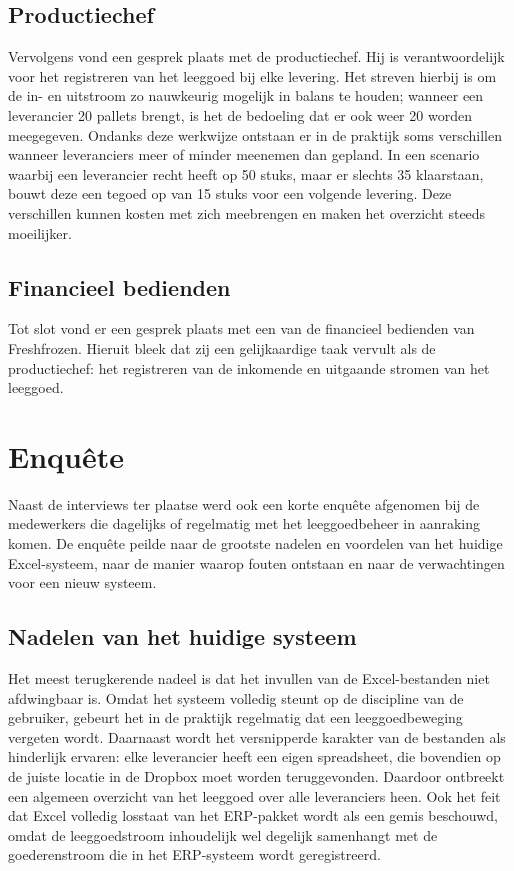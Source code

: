 \subsection{Productiechef}

Vervolgens vond een gesprek plaats met de productiechef. Hij is verantwoordelijk voor het registreren van het leeggoed bij elke levering. Het streven hierbij is om de in- en uitstroom zo nauwkeurig mogelijk in balans te houden; wanneer een leverancier 20 pallets brengt, is het de bedoeling dat er ook weer 20 worden meegegeven.
Ondanks deze werkwijze ontstaan er in de praktijk soms verschillen wanneer leveranciers meer of minder meenemen dan gepland. In een scenario waarbij een leverancier recht heeft op 50 stuks, maar er slechts 35 klaarstaan, bouwt deze een tegoed op van 15 stuks voor een volgende levering. Deze verschillen kunnen kosten met zich meebrengen en maken het overzicht steeds moeilijker.

\subsection{Financieel bedienden}

Tot slot vond er een gesprek plaats met een van de financieel bedienden van Freshfrozen. Hieruit bleek dat zij een gelijkaardige taak vervult als de productiechef: het registreren van de inkomende en uitgaande stromen van het leeggoed.

\section{Enquête}
\label{sec:enquete}

Naast de interviews ter plaatse werd ook een korte enquête afgenomen bij de medewerkers die dagelijks of regelmatig met het leeggoedbeheer in aanraking komen. De enquête peilde naar de grootste nadelen en voordelen van het huidige Excel-systeem, naar de manier waarop fouten ontstaan en naar de verwachtingen voor een nieuw systeem.

\subsection{Nadelen van het huidige systeem}

Het meest terugkerende nadeel is dat het invullen van de Excel-bestanden niet afdwingbaar is. Omdat het systeem volledig steunt op de discipline van de gebruiker, gebeurt het in de praktijk regelmatig dat een leeggoedbeweging vergeten wordt. Daarnaast wordt het versnipperde karakter van de bestanden als hinderlijk ervaren: elke leverancier heeft een eigen spreadsheet, die bovendien op de juiste locatie in de Dropbox moet worden teruggevonden. Daardoor ontbreekt een algemeen overzicht van het leeggoed over alle leveranciers heen. Ook het feit dat Excel volledig losstaat van het ERP-pakket wordt als een gemis beschouwd, omdat de leeggoedstroom inhoudelijk wel degelijk samenhangt met de goederenstroom die in het ERP-systeem wordt geregistreerd.

